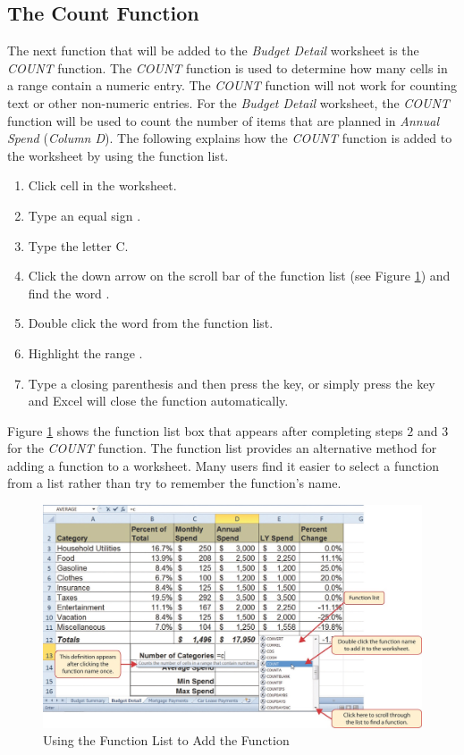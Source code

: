 \subsection{The Count Function}

The next function that will be added to the \textit{Budget Detail} worksheet is the \textit{COUNT} function. The \textit{COUNT} function is used to determine how many cells in a range contain a numeric entry. The \textit{COUNT} function will not work for counting text or other non-numeric entries. For the \textit{Budget Detail} worksheet, the \textit{COUNT} function will be used to count the number of items that are planned in \textit{Annual Spend} (\textit{Column D}). The following explains how the \textit{COUNT} function is added to the worksheet by using the function list.

\begin{enumerate}
	\item Click cell  in the  worksheet.
	\item Type an equal sign \fmtTyping{=}.
	\item Type the letter C.
	\item Click the down arrow on the scroll bar of the function list (see Figure \ref{02:fig17}) and find the word .
	\item Double click the word  from the function list.
	\item Highlight the range .
	\item Type a closing parenthesis \fmtTyping{)} and then press the  key, or simply press the  key and Excel will close the function automatically.
\end{enumerate}

Figure \ref{02:fig17} shows the function list box that appears after completing steps $ 2 $ and $ 3 $ for the \textit{COUNT} function. The function list provides an alternative method for adding a function to a worksheet. Many users find it easier to select a function from a list rather than try to remember the function's name.

\begin{figure}[H]
	\centering
	\includegraphics[width=\maxwidth{.95\linewidth}]{gfx/ch02_fig17}
	\caption{Using the Function List to Add the  Function}
	\label{02:fig17}
\end{figure}

